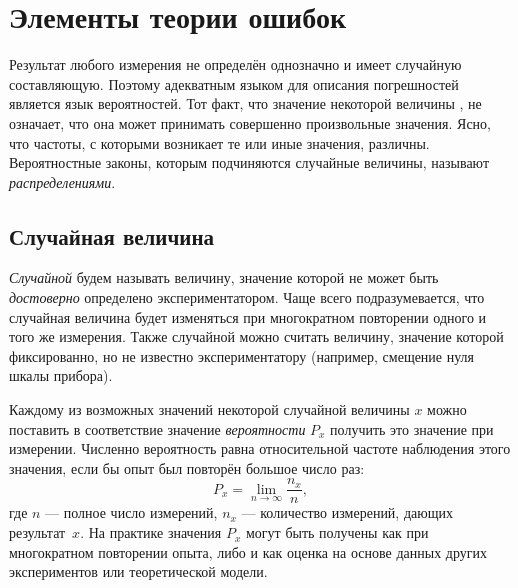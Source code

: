 \chapter{Элементы теории ошибок}
\label{ch:prob}


Результат любого измерения не определён однозначно и имеет случайную составляющую.
Поэтому адекватным языком для описания погрешностей является язык вероятностей.
Тот факт, что значение некоторой величины , не означает, что
она может принимать совершенно произвольные значения. Ясно, что частоты, с которыми
возникает те или иные значения, различны. Вероятностные законы, которым
подчиняются случайные величины, называют \emph{распределениями}.

\section{Случайная величина}

\emph{Случайной} будем называть величину, значение которой не может быть \emph{достоверно} определено экспериментатором. Чаще всего подразумевается, что случайная величина будет изменяться при многократном повторении одного и того же измерения. 
Также случайной можно считать величину, значение которой фиксированно, но не известно экспериментатору (например, смещение нуля шкалы прибора). 


Каждому из возможных значений некоторой случайной величины $x$ можно поставить
в соответствие значение \emph{вероятности} $P_x$ получить это значение при измерении.
Численно вероятность равна относительной частоте наблюдения этого значения, 
если бы опыт был повторён большое число раз:
 \[
 P_x = \lim_{n\to \infty} \frac{n_x}{n},
 \]
где $n$ --- полное число измерений, $n_x$ --- количество измерений, дающих результат~$x$. На практике значения $P_x$ могут быть получены как при многократном повторении опыта, либо и как оценка на основе данных других экспериментов
или теоретической модели.

